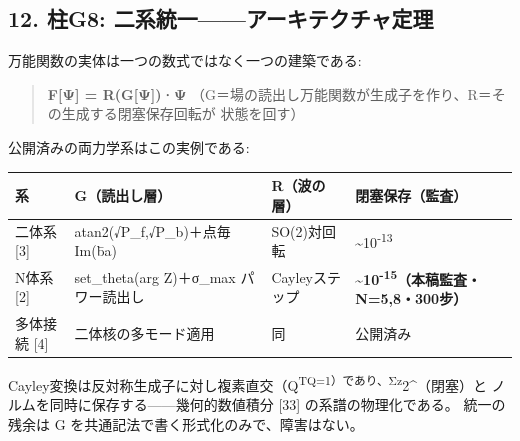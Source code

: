 \documentclass[
]{ltjarticle}
\newcounter{none} %
\begin{document}
\subsection{12. 柱G8:
二系統一------アーキテクチャ定理}\label{ux67f1g8-ux4e8cux7cfbux7d71ux4e00ux30a2ux30fcux30adux30c6ux30afux30c1ux30e3ux5b9aux7406}

万能関数の実体は一つの数式ではなく一つの建築である:

\begin{quote}
\textbf{F{[}Ψ{]} = R(G{[}Ψ{]})·Ψ}
（G＝場の読出し万能関数が生成子を作り、R＝その生成する閉塞保存回転が
状態を回す）
\end{quote}

公開済みの両力学系はこの実例である:

{\def\LTcaptype{none} %
\begin{longtable}[]{@{}
  >{\raggedright\arraybackslash}p{}
  >{\raggedright\arraybackslash}p{}
  >{\raggedright\arraybackslash}p{}
  >{\raggedright\arraybackslash}p{}@{}}
\toprule\noalign{}
\begin{minipage}[b]{\linewidth}\raggedright
系
\end{minipage} & \begin{minipage}[b]{\linewidth}\raggedright
G（読出し層）
\end{minipage} & \begin{minipage}[b]{\linewidth}\raggedright
R（波の層）
\end{minipage} & \begin{minipage}[b]{\linewidth}\raggedright
閉塞保存（監査）
\end{minipage} \\
\midrule\noalign{}
\endhead
\bottomrule\noalign{}
\endlastfoot
二体系 {[}3{]} & atan2(√P\_f,√P\_b)＋点毎 Im(b̄a) & SO(2)対回転 &
\textasciitilde10\textsuperscript{-13} \\
N体系 {[}2{]} & set\_theta(arg Z)＋σ\_max パワー読出し & Cayleyステップ
&
\textbf{\textasciitilde10\textsuperscript{-15}（本稿監査・N=5,8・300步）} \\
多体接続 {[}4{]} & 二体核の多モード適用 & 同 & 公開済み \\
\end{longtable}
}

Cayley変換は反対称生成子に対し複素直交（Q\textsuperscript{TQ=1）であり、Σz}2\^{}（閉塞）と
ノルムを同時に保存する------幾何的数値積分 {[}33{]}
の系譜の物理化である。 統一の残余は G
を共通記法で書く形式化のみで、障害はない。
\end{document}
